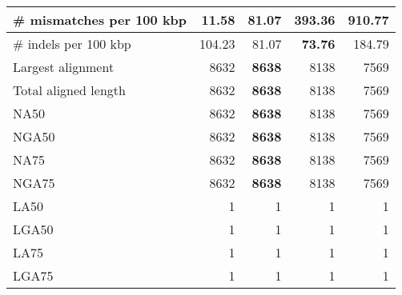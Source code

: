 \documentclass[12pt,a4paper]{article}
\begin{document}
\begin{table}[ht]
\begin{center}
\begin{tabular}{|l*{4}{|r}|}
\# mismatches per 100 kbp & {\bf 11.58} & 81.07 & 393.36 & 910.77 \\ \hline
\# indels per 100 kbp & 104.23 & 81.07 & {\bf 73.76} & 184.79 \\ \hline
Largest alignment & 8632 & {\bf 8638} & 8138 & 7569 \\ \hline
Total aligned length & 8632 & {\bf 8638} & 8138 & 7569 \\ \hline
NA50 & 8632 & {\bf 8638} & 8138 & 7569 \\ \hline
NGA50 & 8632 & {\bf 8638} & 8138 & 7569 \\ \hline
NA75 & 8632 & {\bf 8638} & 8138 & 7569 \\ \hline
NGA75 & 8632 & {\bf 8638} & 8138 & 7569 \\ \hline
LA50 & 1 & 1 & 1 & 1 \\ \hline
LGA50 & 1 & 1 & 1 & 1 \\ \hline
LA75 & 1 & 1 & 1 & 1 \\ \hline
LGA75 & 1 & 1 & 1 & 1 \\ \hline
\end{tabular}
\end{center}
\end{table}
\end{document}
